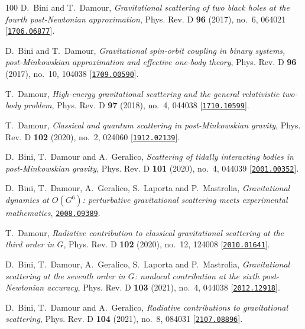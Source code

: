 \begin{thebibliography}{100}
D.~Bini and T.~Damour,  {\em {Gravitational scattering of two black holes at
  the fourth post-Newtonian approximation}}, Phys. Rev. D {\bf 96} (2017),
  no.~6, 064021 [\href{http://www.arXiv.org/abs/1706.06877}{{\tt 1706.06877}}].

D.~Bini and T.~Damour,  {\em {Gravitational spin-orbit coupling in binary
  systems, post-Minkowskian approximation and effective one-body theory}},
  Phys. Rev. D {\bf 96} (2017), no.~10, 104038
  [\href{http://www.arXiv.org/abs/1709.00590}{{\tt 1709.00590}}].

T.~Damour,  {\em {High-energy gravitational scattering and the general
  relativistic two-body problem}}, Phys. Rev. D {\bf 97} (2018), no.~4, 044038
  [\href{http://www.arXiv.org/abs/1710.10599}{{\tt 1710.10599}}].

T.~Damour,  {\em {Classical and quantum scattering in post-Minkowskian
  gravity}}, Phys. Rev. D {\bf 102} (2020), no.~2, 024060
  [\href{http://www.arXiv.org/abs/1912.02139}{{\tt 1912.02139}}].

D.~Bini, T.~Damour and A.~Geralico,  {\em {Scattering of tidally interacting
  bodies in post-Minkowskian gravity}}, Phys. Rev. D {\bf 101} (2020), no.~4,
  044039 [\href{http://www.arXiv.org/abs/2001.00352}{{\tt 2001.00352}}].

D.~Bini, T.~Damour, A.~Geralico, S.~Laporta and P.~Mastrolia,  {\em
  {Gravitational dynamics at $O(G^6)$: perturbative gravitational scattering
  meets experimental mathematics}},
  \href{http://www.arXiv.org/abs/2008.09389}{{\tt 2008.09389}}.

T.~Damour,  {\em {Radiative contribution to classical gravitational scattering
  at the third order in $G$}}, Phys. Rev. D {\bf 102} (2020), no.~12, 124008
  [\href{http://www.arXiv.org/abs/2010.01641}{{\tt 2010.01641}}].

D.~Bini, T.~Damour, A.~Geralico, S.~Laporta and P.~Mastrolia,  {\em
  {Gravitational scattering at the seventh order in $G$: nonlocal contribution
  at the sixth post-Newtonian accuracy}}, Phys. Rev. D {\bf 103} (2021), no.~4,
  044038 [\href{http://www.arXiv.org/abs/2012.12918}{{\tt 2012.12918}}].

D.~Bini, T.~Damour and A.~Geralico,  {\em {Radiative contributions to
  gravitational scattering}}, Phys. Rev. D {\bf 104} (2021), no.~8, 084031
  [\href{http://www.arXiv.org/abs/2107.08896}{{\tt 2107.08896}}].


\end{thebibliography}
